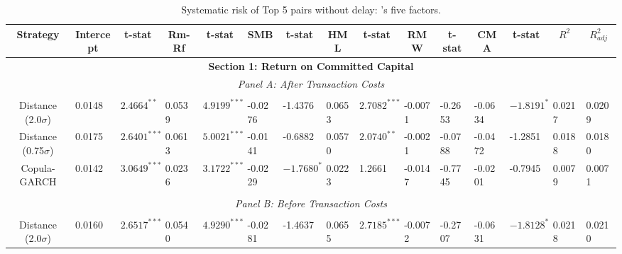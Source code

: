 \documentclass[a4paper]{article}
\begin{document}
	
	\begin{sidewaystable}
		\caption{Systematic risk of Top 5 pairs without delay: \citet*{ff15}'s five factors.}
		\begin{threeparttable}[H]
			\centering \scriptsize
			\begin{tabularx}{\textwidth}{@{\extracolsep{\fill}}lllllllllllllll@{}}
				\toprule
				\multicolumn{1}{c}{Strategy} & \multicolumn{1}{c}{Intercept} & \multicolumn{1}{c}{t-stat} & \multicolumn{1}{c}{Rm-Rf} & \multicolumn{1}{c}{t-stat} & \multicolumn{1}{c}{SMB} & \multicolumn{1}{c}{t-stat} & \multicolumn{1}{c}{HML} & \multicolumn{1}{c}{t-stat} & \multicolumn{1}{c}{RMW} & \multicolumn{1}{c}{t-stat} & \multicolumn{1}{c}{CMA} & \multicolumn{1}{c}{t-stat} & \multicolumn{1}{c}{$R^{2}$} & \multicolumn{1}{c}{$R^{2}_{adj}$} \\
				\midrule
				\multicolumn{15}{c}{\textbf{Section 1: Return on Committed Capital}} \\
				\multicolumn{15}{c}{\textit{Panel A: After Transaction Costs}} \\
				\multicolumn{1}{c}{} & \multicolumn{1}{c}{} & \multicolumn{1}{c}{} & \multicolumn{1}{c}{} & \multicolumn{1}{c}{} & \multicolumn{1}{c}{} & \multicolumn{1}{c}{} & \multicolumn{1}{c}{} &       &       &       &       &       &       &  \\
				\multicolumn{1}{c}{Distance (2.0$\sigma$)} & 0.0148 & $2.4664^{**}$ & 0.0539 & $4.9199^{***}$ & -0.0276 & -1.4376 & 0.0653 & $2.7082^{***}$ & -0.0071 & -0.2653 & -0.0634 & $-1.8191^{*}$ & 0.0217 & 0.0209 \\
				\multicolumn{1}{c}{Distance (0.75$\sigma$)} & 0.0175 & $2.6401^{***}$ & 0.0613 & $5.0021^{***}$ & -0.0141 & -0.6882 & 0.0570 & $2.0740^{**}$ & -0.0021 & -0.0788 & -0.0472 & -1.2851 & 0.0188 & 0.0180 \\
				\multicolumn{1}{c}{Copula-GARCH} & 0.0142 & $3.0649^{***}$ & 0.0236 & $3.1722^{***}$ & -0.0229 & $-1.7680^{*}$ & 0.0223 & 1.2661 & -0.0147 & -0.7745 & -0.0201 & -0.7945 & 0.0079 & 0.0071 \\
				&       &       &       &       &       &       &       &       &       &       &       &       &       &  \\
				\multicolumn{15}{c}{\textit{Panel B: Before Transaction Costs}} \\
				&       &       &       &       &       &       &       &       &       &       &       &       &       &  \\
				\multicolumn{1}{c}{Distance (2.0$\sigma$)} & 0.0160 & $2.6517^{***}$ & 0.0540 & $4.9290^{***}$ & -0.0281 & -1.4637 & 0.0655 & $2.7185^{***}$ & -0.0072 & -0.2707 & -0.0631 & $-1.8128^{*}$ & 0.0218 & 0.0210 \\

\end{tabularx}
\end{threeparttable}
\end{sidewaystable}
\end{document}
